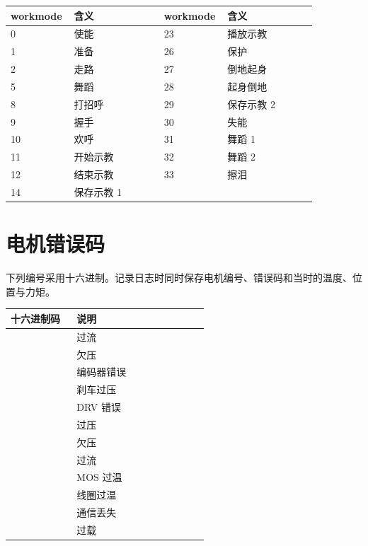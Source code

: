 \begingroup\small\renewcommand{\arraystretch}{1.15}
\begin{longtable}{@{}P{0.14\linewidth}P{0.29\linewidth}P{0.14\linewidth}P{0.29\linewidth}@{}}
\toprule
\textbf{workmode} & \textbf{含义} & \textbf{workmode} & \textbf{含义} \\
\midrule{} & 使能 & 23 & 播放示教 \\
1 & 准备 & 26 & 保护 \\
2 & 走路 & 27 & 倒地起身 \\
5 & 舞蹈 & 28 & 起身倒地 \\
8 & 打招呼 & 29 & 保存示教 2 \\
9 & 握手 & 30 & 失能 \\
10 & 欢呼 & 31 & 舞蹈 1 \\
11 & 开始示教 & 32 & 舞蹈 2 \\
12 & 结束示教 & 33 & 擦泪 \\
14 & 保存示教 1 &  &  \\
\bottomrule\end{longtable}\endgroup

\section{电机错误码}
下列编号采用十六进制。记录日志时同时保存电机编号、错误码和当时的温度、位置与力矩。

\begingroup\small\renewcommand{\arraystretch}{1.15}
\begin{longtable}{@{}P{0.3\linewidth}P{0.6\linewidth}@{}}
\toprule
\textbf{十六进制码} & \textbf{说明} \\
\midrule\endhead
{} & 过流 \\
 & 欠压 \\
 & 编码器错误 \\
 & 刹车过压 \\
 & DRV 错误 \\
 & 过压 \\
 & 欠压 \\
 & 过流 \\
 & MOS 过温 \\
 & 线圈过温 \\
 & 通信丢失 \\
 & 过载 \\
\bottomrule\end{longtable}\endgroup

